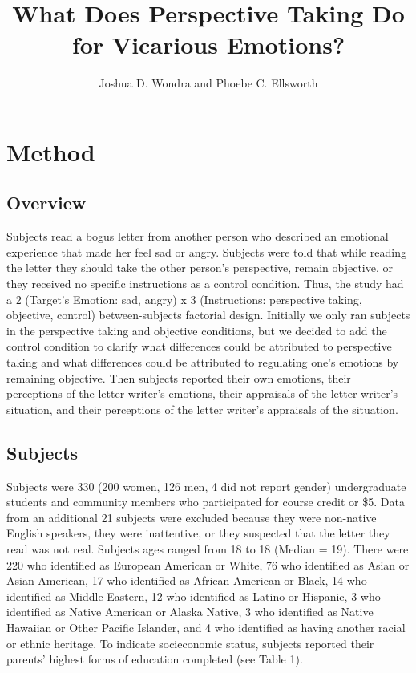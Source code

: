 \documentclass[man,a4paper,noextraspace,apacite]{apa6}\usepackage[]{graphicx}\usepackage[]{color}
\title{What Does Perspective Taking Do for Vicarious Emotions?}
\author{Joshua D. Wondra and Phoebe C. Ellsworth}
\affiliation{University of Michigan}
\begin{document}
\maketitle

\section{Method}



\subsection{Overview}

    Subjects read a bogus letter from another person who described an emotional experience that made her feel sad or angry. Subjects were told that while reading the letter they should take the other person's perspective, remain objective, or they received no specific instructions as a control condition. Thus, the study had a 2 (Target's Emotion: sad, angry) x 3 (Instructions: perspective taking, objective, control) between-subjects factorial design. Initially we only ran subjects in the perspective taking and objective conditions, but we decided to add the control condition to clarify what differences could be attributed to perspective taking and what differences could be attributed to regulating one's emotions by remaining objective. Then subjects reported their own emotions, their perceptions of the letter writer's emotions, their appraisals of the letter writer's situation, and their perceptions of the letter writer's appraisals of the situation.
    
\subsection{Subjects}

    Subjects were 330 (200 women, 126 men, 4 did not report gender) undergraduate students and community members who participated for course credit or \$5. Data from an additional 21 subjects were excluded because they were non-native English speakers, they were inattentive, or they suspected that the letter they read was not real. Subjects ages ranged from 18 to 18 (Median = 19). There were 220 who identified as European American or White, 76 who identified as Asian or Asian American, 17 who identified as African American or Black, 14 who identified as Middle Eastern, 12 who identified as Latino or Hispanic, 3 who identified as Native American or Alaska Native, 3 who identified as Native Hawaiian or Other Pacific Islander, and 4 who identified as having another racial or ethnic heritage. To indicate socieconomic status, subjects reported their parents' highest forms of education completed (see Table 1).
    
\end{document}
